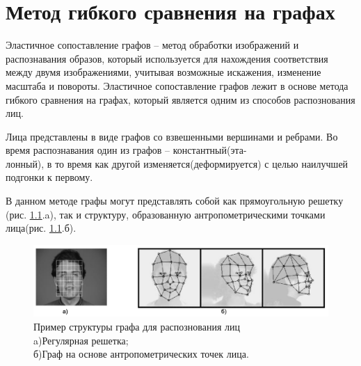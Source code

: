 \chapter{Метод гибкого сравнения на графах}

Эластичное сопоставление графов -- метод обработки изображений и распознавания образов, который 
используется для нахождения соответствия между двумя изображениями, учитывая возможные искажения, изменение масштаба и повороты. 
Эластичное сопоставление графов лежит в основе метода гибкого
сравнения на графах, который является одним из способов распознования лиц\cite{distances}.

Лица представлены в виде графов со взвешенными
вершинами и ребрами\cite{wen}. Во время распознавания один из графов – константный(эта-\\
лонный), в то время как другой изменяется(деформируется) с 
целью наилучшей подгонки к первому. 

В данном методе графы могут представлять собой как 
прямоугольную решетку (рис. \ref{img:ant}.a), так и структуру, образованную антропометрическими
точками лица(рис. \ref{img:ant}.б).

\begin{figure}[h]
    \centering
    \includegraphics[height=0.15\textheight]{img/ex.jpg}
    \caption{Пример структуры графа для распознования лиц \\ 
    a)Регулярная решетка; \\ б)Граф на основе антропометрических точек лица.}
    \label{img:ant}
\end{figure}

